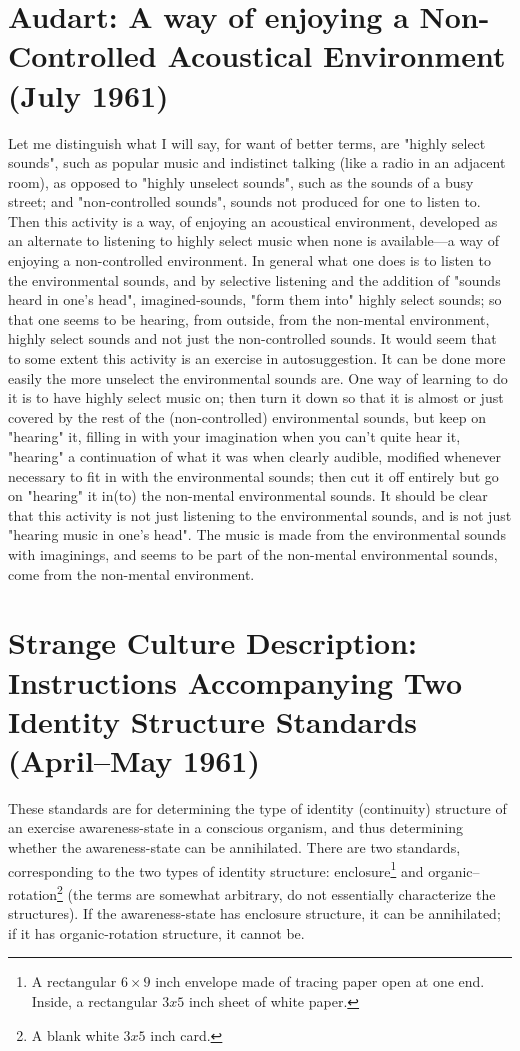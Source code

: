 \section{Audart: A way of enjoying a Non-Controlled Acoustical Environment (July 1961)}
Let me distinguish what I will say, for want of better
terms, are "highly select sounds", such as popular music and 
indistinct talking (like a radio in an adjacent room), as 
opposed to "highly unselect sounds", such as the sounds of a
busy street; and "non-controlled sounds", sounds not produced
for one to listen to. Then this activity is a way, of enjoying
an acoustical environment, developed as an alternate to
listening to highly select music when none is available---a
way of enjoying a non-controlled environment. In general what
one does is to listen to the environmental sounds, and by
selective listening and the addition of "sounds heard in one's
head", imagined-sounds, "form them into" highly select sounds;
so that one seems to be hearing, from outside, from the non-mental
environment, highly select sounds and not just the non-controlled
sounds. It would seem that to some extent this 
activity is an exercise in autosuggestion. It can be done more
easily the more unselect the environmental sounds are. One way 
of learning to do it is to have highly select music on; then 
turn it down so that it is almost or just covered by the rest
of the (non-controlled) environmental sounds, but keep on 
"hearing" it, filling in with your imagination when you can't
quite hear it, "hearing" a continuation of what it was when 
clearly audible, modified whenever necessary to fit in with 
the environmental sounds; then cut it off entirely but go on 
"hearing" it in(to) the non-mental environmental sounds. It 
should be clear that this activity is not just listening to the
environmental sounds, and is not just "hearing music in one's 
head". The music is made from the environmental sounds with
imaginings, and seems to be part of the non-mental environmental
sounds, come from the non-mental environment. 

\section{Strange Culture Description: Instructions Accompanying Two Identity Structure Standards (April--May 1961)}

These standards are for determining the type of identity 
(continuity) structure of an exercise awareness-state in a
conscious organism, and thus determining whether the awareness-state
can be annihilated. There are two standards, corresponding
to the two types of identity structure: enclosure\footnote{A rectangular $6\times9$ inch envelope made of tracing paper open at one end. Inside, a rectangular $3x5$ inch sheet of white paper.} and 
organic--rotation\footnote{A blank white $3x5$ inch card.} (the terms are somewhat arbitrary, do not
essentially characterize the structures). If the awareness-state
has enclosure structure, it can be annihilated; if it 
has organic-rotation structure, it cannot be. 

